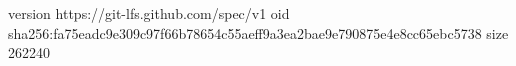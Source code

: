 version https://git-lfs.github.com/spec/v1
oid sha256:fa75eadc9e309c97f66b78654c55aeff9a3ea2bae9e790875e4e8cc65ebc5738
size 262240
